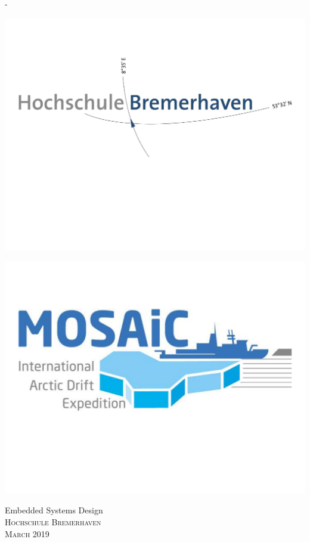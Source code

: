 \begin{titlingpage}
\begin{SingleSpace}
\begin{adjustwidth*}{\unitlength}{-\unitlength}
\begin{center}
\hspace{10mm}
\includegraphics[scale=0.15]{logos/hsbrv}\\
\begin{center}
\includegraphics[scale=0.15]{logos/mosaic}\\
\end{center}
\vspace{6mm}
{\large Embedded Systems Design\\
\textsc{Hochschule Bremerhaven}}\\
\vspace{11mm}
\vspace{9mm}
{\large\textsc{March 2019}}
\vspace{12mm}
\end{center}
\end{adjustwidth*}
\end{SingleSpace}
\end{titlingpage}